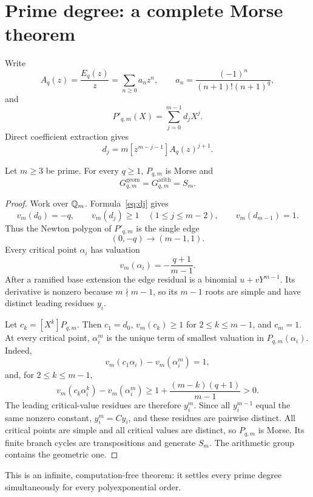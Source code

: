 \section{Prime degree: a complete Morse theorem}

Write
\[
A_q(z)=\frac{E_q(z)}z
=\sum_{n\ge0}a_nz^n,
\qquad
a_n=\frac{(-1)^n}{(n+1)!(n+1)^q},
\]
and
\[
P'_{q,m}(X)=\sum_{j=0}^{m-1}d_jX^j.
\]
Direct coefficient extraction gives
\begin{equation}
\boxed{d_j=m[z^{m-j-1}]A_q(z)^{j+1}.}
\label{eq:dj}
\end{equation}

\begin{theorem}\label{thm:prime}
Let $m\ge3$ be prime. For every $q\ge1$, $P_{q,m}$ is Morse and
\begin{equation}
\boxed{G^{\mathrm{geom}}_{q,m}=G^{\mathrm{arith}}_{q,m}=S_m.}
\label{eq:prime-mon}
\end{equation}
\end{theorem}

\begin{proof}
Work over $\mathbb Q_m$. Formula~\eqref{eq:dj} gives
\[
v_m(d_0)=-q,
\qquad
v_m(d_j)\ge1\quad(1\le j\le m-2),
\qquad
v_m(d_{m-1})=1.
\]
Thus the Newton polygon of $P'_{q,m}$ is the single edge
\[
(0,-q)\longrightarrow(m-1,1).
\]
Every critical point $\alpha_i$ has valuation
\[
v_m(\alpha_i)=-\frac{q+1}{m-1}.
\]
After a ramified base extension the edge residual is a binomial
$u+vY^{m-1}$. Its derivative is nonzero because $m\nmid m-1$, so its
$m-1$ roots are simple and have distinct leading residues $y_i$.

Let $c_k=[X^k]P_{q,m}$. Then $c_1=d_0$, $v_m(c_k)\ge1$ for
$2\le k\le m-1$, and $c_m=1$. At every critical point,
$\alpha_i^m$ is the unique term of smallest valuation in
$P_{q,m}(\alpha_i)$. Indeed,
\[
v_m(c_1\alpha_i)-v_m(\alpha_i^m)=1,
\]
and, for $2\le k\le m-1$,
\[
v_m(c_k\alpha_i^k)-v_m(\alpha_i^m)
\ge1+\frac{(m-k)(q+1)}{m-1}>0.
\]
The leading critical-value residues are therefore $y_i^m$. Since all
$y_i^{m-1}$ equal the same nonzero constant, $y_i^m=Cy_i$, and these
residues are pairwise distinct. All critical points are simple and all
critical values are distinct, so $P_{q,m}$ is Morse. Its finite branch
cycles are transpositions and generate $S_m$. The arithmetic group contains
the geometric one.
\end{proof}

This is an infinite, computation-free theorem: it settles every prime
degree simultaneously for every polyexponential order.

